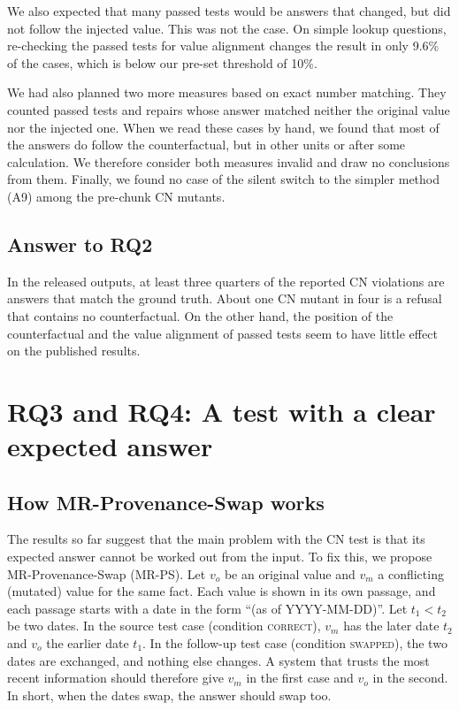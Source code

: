 \documentclass[preprint,12pt,authoryear]{elsarticle}
\newcommand{\cn}{\textsc{CN}}
\newcommand{\mrps}{\textsc{MR-PS}}
\begin{document}
We also expected that many passed tests would be answers that changed, but did not follow the
injected value. This was not the case. On simple lookup questions, re-checking the passed tests for
value alignment changes the result in only 9.6\% of the cases, which is below our pre-set threshold
of 10\%.

We had also planned two more measures based on exact number matching. They counted passed tests and
repairs whose answer matched neither the original value nor the injected one. When we read these
cases by hand, we found that most of the answers do follow the counterfactual, but in other units or
after some calculation. We therefore consider both measures invalid and draw no conclusions from
them. Finally, we found no case of the silent switch to the simpler method (A9) among the
pre-chunk \cn{} mutants.

\subsection{Answer to RQ2}
In the released outputs, at least three quarters of the reported \cn{} violations are answers that
match the ground truth. About one \cn{} mutant in four is a refusal that contains no counterfactual.
On the other hand, the position of the counterfactual and the value alignment of passed tests seem
to have little effect on the published results.

\section{RQ3 and RQ4: A test with a clear expected answer}
\label{sec:mrps}

\subsection{How MR-Provenance-Swap works}
The results so far suggest that the main problem with the \cn{} test is that its expected answer
cannot be worked out from the input. To fix this, we propose MR-Provenance-Swap (\mrps). Let $v_o$ be
an original value and $v_m$ a conflicting (mutated) value for the same fact. Each value is shown in
its own passage, and each passage starts with a date in the form ``(as of YYYY-MM-DD)''. Let
$t_1 < t_2$ be two dates. In the source test case (condition \textsc{correct}), $v_m$ has the later
date $t_2$ and $v_o$ the earlier date $t_1$. In the follow-up test case (condition \textsc{swapped}),
the two dates are exchanged, and nothing else changes. A system that trusts the most recent
information should therefore give $v_m$ in the first case and $v_o$ in the second. In short, when the
dates swap, the answer should swap too.
\end{document}

